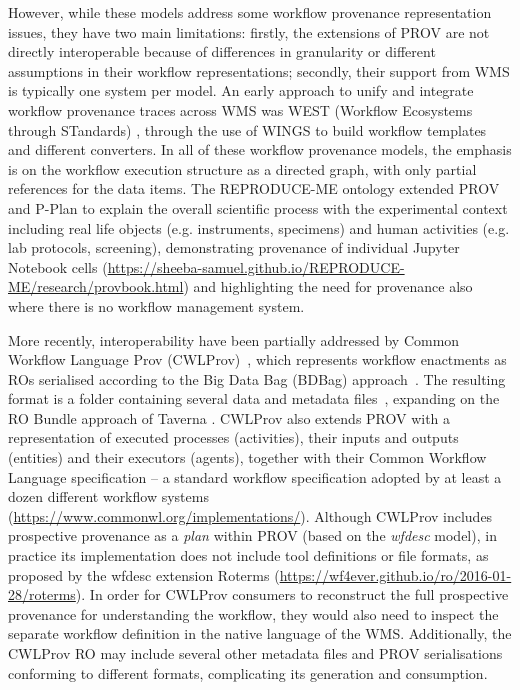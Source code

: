 \documentclass[10pt,letterpaper]{article}
\begin{document}
However, while these models address some workflow provenance representation issues, they have two main limitations: firstly, the extensions of PROV are not directly interoperable because of differences in granularity or different assumptions in their workflow representations; secondly, their support from WMS is typically one system per model.  An early approach to unify and integrate workflow provenance traces across WMS was WEST (Workflow Ecosystems through STandards) \cite{Garijo 2014}, through the use of WINGS \cite{Gil 2011} to build workflow templates and different converters. In all of these workflow provenance models, the emphasis is on the workflow execution structure as a directed graph, with only partial references for the data items. 
The REPRODUCE-ME ontology \cite{Samuel 2022} extended PROV and P-Plan to explain the overall scientific process with the experimental context including real life objects (e.g. instruments, specimens) and human activities (e.g. lab protocols, screening), demonstrating provenance of individual Jupyter Notebook cells (\url{https://sheeba-samuel.github.io/REPRODUCE-ME/research/provbook.html}) and highlighting the need for provenance also where there is no workflow management system. 

More recently, interoperability have been partially addressed by Common Workflow Language Prov (CWLProv)~\cite{Khan 2019}, which represents workflow enactments as ROs serialised according to the Big Data Bag (BDBag) approach~\cite{Chard 2016}.
The resulting format is a folder containing several data and metadata files~\cite{Soiland-Reyes 2018}, expanding on the RO Bundle approach of Taverna \cite{Soiland-Reyes 2016}.
CWLProv also extends PROV with a representation of executed processes (activities), their inputs and outputs (entities) and their executors (agents), together with their Common Workflow Language specification
\cite{Crusoe 2022} -- a standard workflow specification adopted by at least a dozen different workflow systems (\url{https://www.commonwl.org/implementations/}). Although CWLProv includes prospective provenance as a \emph{plan}
within PROV (based on the \emph{wfdesc} model), in practice its implementation does not include tool definitions or file formats, as proposed by the wfdesc extension Roterms (\url{https://wf4ever.github.io/ro/2016-01-28/roterms}).
In order for CWLProv consumers to reconstruct the full prospective provenance for understanding the workflow, they would also need to inspect the separate workflow definition in the native language of the WMS.
Additionally, the CWLProv RO may include several other metadata files and PROV serialisations conforming to different formats, complicating its generation and consumption.
\end{document}
